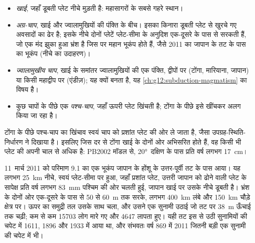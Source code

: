 \begin{itemize}
  \item \emph{खाई}, जहाँ डूबती प्लेट नीचे मुड़ती है: महासागरों के सबसे गहरे
        स्थान।
  \item \emph{अग्र-चाप}, खाई और ज्वालामुखियों की पंक्ति के बीच। इसका
        किनारा डूबती प्लेट से खुरचे गए अवसादों का ढेर है; इसके नीचे
        दोनों प्लेटें प्लेट-सीमा के अनुदिश एक-दूसरे के पास से सरकती हैं, जो एक
        मंद झुका हुआ भ्रंश है जिस पर महान भूकंप होते हैं, जैसे
        2011 का जापान के तट के पास का भूकंप (नीचे का उदाहरण)।
  \item \emph{ज्वालामुखीय चाप}, खाई के समांतर ज्वालामुखियों की एक पंक्ति,
        द्वीपों पर (टोंगा, मारियाना, जापान) या किसी महाद्वीप पर (एंडीज़);
        यह क्यों बनता है, यह \cref{ch:g12:subduction-magmatism} का विषय है।
  \item कुछ चापों के पीछे एक \emph{पश्च-चाप}, जहाँ ऊपरी प्लेट
        खिंचती है; टोंगा के पीछे इसे खींचकर अलग किया जा रहा है।
\end{itemize}

टोंगा के पीछे पश्च-चाप का खिंचाव स्वयं चाप को प्रशांत
प्लेट की ओर ले जाता है, जैसा उपग्रह-स्थिति-निर्धारण ने दिखाया है। इसलिए जिस दर से टोंगा खाई के दोनों ओर अभिसरित होते हैं,
वह किसी भी प्लेट की अपनी चाल से अधिक है: PB2002 मॉडल से,
\ang{20}~दक्षिण के पास प्रति वर्ष लगभग \qty{17}{cm}।

\begin{example}[तोहोकु भूकंप, 2011]\label{ex:g11:subduction-zones:tohoku}
11~मार्च 2011 को परिमाण 9.1 का एक भूकंप जापान के होंशू के उत्तर-पूर्वी
तट के पास आया। यह लगभग \qty{25}{km} नीचे, स्वयं प्लेट-सीमा पर हुआ,
जहाँ प्रशांत प्लेट, उत्तरी जापान को ढोने वाली प्लेट के सापेक्ष प्रति वर्ष लगभग \qty{83}{mm}
पश्चिम की ओर चलती हुई, जापान खाई पर उसके नीचे डूबती है। भ्रंश के
दोनों ओर एक-दूसरे के पास से 50 से \qty{60}{m} तक सरके, लगभग \qty{400}{km} लंबे और
\qty{150}{km} चौड़े क्षेत्र पर। ऊपर का समुद्री तल उसके साथ चला, और उसने एक सुनामी उठाई
जो तट पर \qty{38}{m} ऊँचाई तक चढ़ी; कम से कम \num{15703} लोग
मारे गए और \num{4647} लापता हुए। यही तट इस  से उठी सुनामियों की
चपेट में 1611, 1896 और 1933 में आया था, और संभवतः वर्ष 869 में 2011 जितनी
बड़ी एक सुनामी की चपेट में भी।
\end{example}

